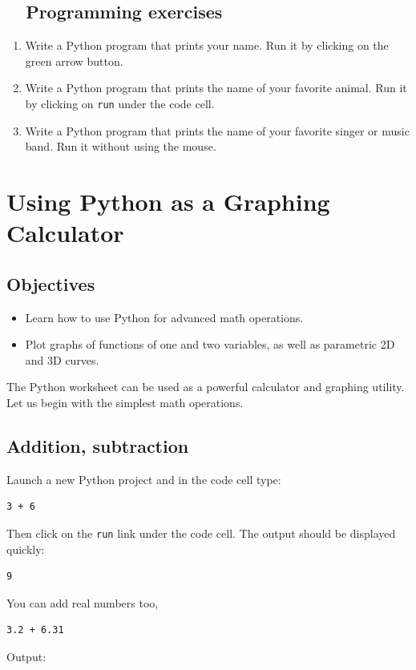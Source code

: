 \subsection{\ \ Programming exercises}

\begin{enumerate}
\item Write a Python program that prints your name. Run it by clicking on the green arrow button.
\item Write a Python program that prints the name of your favorite animal. 
      Run it by clicking on {\tt run} under the code cell.
\item Write a Python program that prints the name of your favorite singer 
      or music band. Run it without using the mouse.
\end{enumerate}

\section{Using Python as a Graphing Calculator} \label{sec:calc}

\subsection{Objectives}

\begin{itemize}
\item Learn how to use Python for advanced math operations.
\item Plot graphs of functions of one and two variables, as well as parametric 2D and 3D curves.
\end{itemize}
The Python worksheet can be used as a powerful calculator and graphing utility. 
Let us begin with the simplest math operations.

\subsection{Addition, subtraction}

Launch a new Python project and in the code cell type:

\begin{verbatim}
3 + 6
\end{verbatim}
Then click on the {\tt run} link under the code cell. The output should be displayed quickly:

\begin{verbatim}
9
\end{verbatim}
You can add real numbers too,
\begin{verbatim}
3.2 + 6.31
\end{verbatim}
Output:

